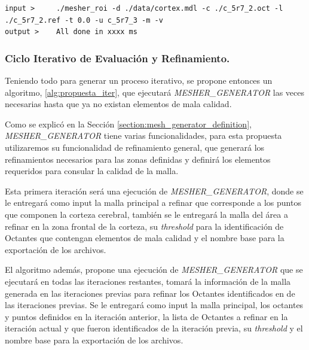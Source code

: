 \begin{lstlisting}[style=Console,caption={Generador de malla, crea una nueva malla, tomando como input la malla inicial \textit{c\_5r7\_0.oct}, la lista de octantes a refinar \textit{c\_5r7\_0.ref}, la cota de calidad $J_{ENS}$ definido en cero, se exportará la malla con el nombre \textit{c\_5r7\_1}, en formato vtk y m3d.\\ Fuente: Elaboración propia.},label={code:ref_oct_labeled_iter_3}]
input >     ./mesher_roi -d ./data/cortex.mdl -c ./c_5r7_2.oct -l ./c_5r7_2.ref -t 0.0 -u c_5r7_3 -m -v
output >    All done in xxxx ms
\end{lstlisting}


\subsubsection{Ciclo Iterativo de Evaluación y Refinamiento.}

Teniendo todo para generar un proceso iterativo, se propone entonces un algoritmo, \autoref{alg:propuesta_iter}, que ejecutará \textit{MESHER\_GENERATOR} las veces necesarias hasta que ya no existan elementos de mala calidad.

Como se explicó en la Sección \ref{section:mesh_generator_definition}, \textit{MESHER\_GENERATOR} tiene varias funcionalidades, para esta propuesta utilizaremos su funcionalidad de refinamiento general, que generará los refinamientos necesarios para las zonas definidas y definirá los elementos requeridos para consular la calidad de la malla.

Esta primera iteración será una ejecución de \textit{MESHER\_GENERATOR}, donde se le entregará como input la malla principal a refinar que corresponde a los puntos que componen la corteza cerebral, también se le entregará la malla del área a refinar en la zona frontal de la corteza, su \textit{threshold} para la identificación de Octantes que contengan elementos de mala calidad y el nombre base para la exportación de los archivos.

El algoritmo además, propone una ejecución de \textit{MESHER\_GENERATOR} que se ejecutará en todas las iteraciones restantes, tomará la información de la malla generada en las iteraciones previas para refinar los Octantes identificados en de las iteraciones previas. Se le entregará como input la malla principal, los octantes y puntos definidos en la iteración anterior, la lista de Octantes a refinar en la iteración actual y que fueron identificados de la iteración previa, su \textit{threshold} y el nombre base para la exportación de los archivos. 


